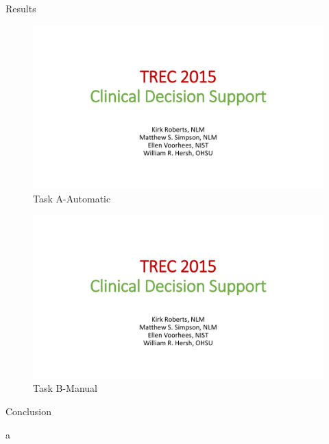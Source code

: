 \documentclass[final]{beamer}
\newlength{\onecolwid}
\begin{document}
\begin{frame}[t]
\begin{columns}[t]
\begin{column}{\onecolwid}
\begin{block}{Results}
  \begin{figure}
    \includegraphics[page=13,trim={7cm 0 7cm 7cm},clip]{images/2015-CDS-Results.pdf}
    \caption{Task A-Automatic}
  \end{figure}

  \begin{figure}
    \includegraphics[page=16,trim={7cm 0 7cm 7cm},clip]{images/2015-CDS-Results.pdf}
    \caption{Task B-Manual}
  \end{figure}
\end{block}





\begin{block}{Conclusion}

a

\end{block}



\end{column}
\end{columns}
\end{frame}
\end{document}
